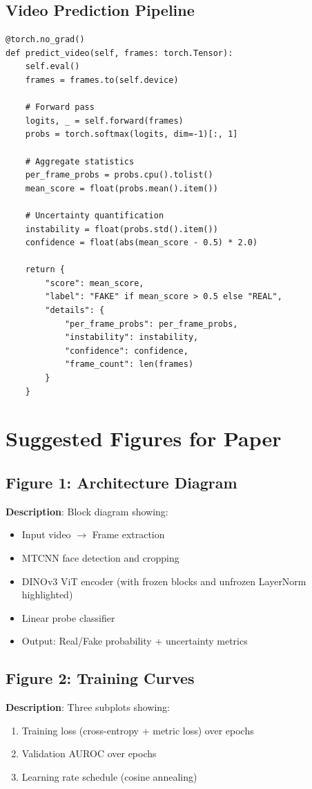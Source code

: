 \documentclass[11pt,a4paper]{article}
\begin{document}
\subsection{Video Prediction Pipeline}

\begin{lstlisting}[caption=Video-Level Prediction with Uncertainty]
@torch.no_grad()
def predict_video(self, frames: torch.Tensor):
    self.eval()
    frames = frames.to(self.device)
    
    # Forward pass
    logits, _ = self.forward(frames)
    probs = torch.softmax(logits, dim=-1)[:, 1]
    
    # Aggregate statistics
    per_frame_probs = probs.cpu().tolist()
    mean_score = float(probs.mean().item())
    
    # Uncertainty quantification
    instability = float(probs.std().item())
    confidence = float(abs(mean_score - 0.5) * 2.0)
    
    return {
        "score": mean_score,
        "label": "FAKE" if mean_score > 0.5 else "REAL",
        "details": {
            "per_frame_probs": per_frame_probs,
            "instability": instability,
            "confidence": confidence,
            "frame_count": len(frames)
        }
    }
\end{lstlisting}

\section{Suggested Figures for Paper}

\subsection{Figure 1: Architecture Diagram}
\textbf{Description}: Block diagram showing:
\begin{itemize}
    \item Input video $\rightarrow$ Frame extraction
    \item MTCNN face detection and cropping
    \item DINOv3 ViT encoder (with frozen blocks and unfrozen LayerNorm highlighted)
    \item Linear probe classifier
    \item Output: Real/Fake probability + uncertainty metrics
\end{itemize}

\subsection{Figure 2: Training Curves}
\textbf{Description}: Three subplots showing:
\begin{enumerate}
    \item Training loss (cross-entropy + metric loss) over epochs
    \item Validation AUROC over epochs
    \item Learning rate schedule (cosine annealing)
\end{enumerate}
\end{document}
